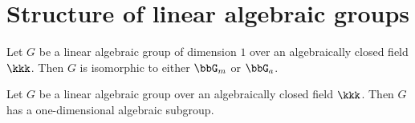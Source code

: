 \section{Structure of linear algebraic groups}


    \begin{theorem}\label{thm:classification_of_linear_alg_gp_of_dim1}
        Let \(G\) be a linear algebraic group of dimension \(1\) over an algebraically closed field \(\kkk\). 
        Then \(G\) is isomorphic to either \(\bbG_m\) or \(\bbG_a\).
    \end{theorem}

    \begin{lemma}\label{lem:any_linear_alg_gp_has_one_dimensional_alg_subgroup}
        Let \(G\) be a linear algebraic group over an algebraically closed field \(\kkk\). 
        Then \(G\) has a one-dimensional algebraic subgroup.
    \end{lemma}
